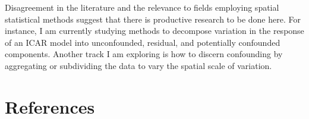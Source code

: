 \documentclass[11pt, oneside]{article}   	%
\begin{document}
Disagreement in the literature and the relevance to fields employing
spatial statistical methods suggest that there is productive research to
be done here. For instance, I am currently studying methods to decompose
variation in the response of an ICAR model into unconfounded, residual,
and potentially confounded components. Another track I am exploring is
how to discern confounding by aggregating or subdividing the data to
vary the spatial scale of variation.

\section*{References}


\end{document}
